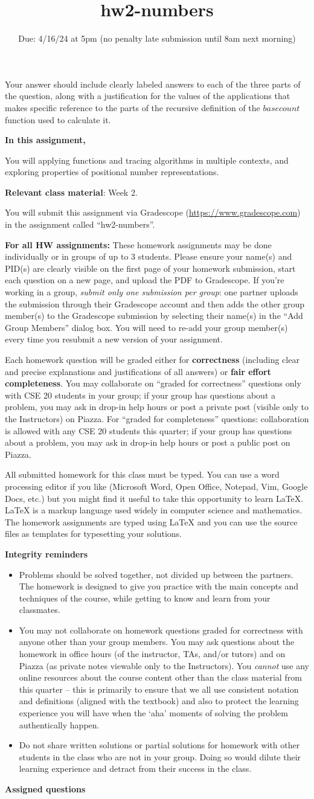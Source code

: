 \documentclass[12pt, oneside]{article}
\newcommand{\instructions}{{\bf For all HW assignments:} 
These homework assignments may be done individually or in groups of up to 3 students.
Please ensure your name(s) and PID(s)
are clearly visible on the first page of your homework
submission, start each question on a new page, and upload the PDF to Gradescope.
If you're working in a group, {\it submit only one submission per group}: one partner uploads the
submission through their Gradescope account and then adds the other group member(s) to the Gradescope submission
by selecting their name(s) in the ``Add Group Members'' dialog box. You will need to re-add your group member(s)
every time you resubmit a new version of your assignment.

Each homework question will be graded either for
{\bf correctness} (including clear and precise explanations and justifications of all answers) or
{\bf fair effort completeness}. You may collaborate on ``graded for correctness''
questions only with CSE 20 students in your group; if your
 group has questions about a problem, you may ask in drop-in help hours or post a private
post (visible only to the Instructors) on Piazza.  
 For ``graded for completeness''
 questions: collaboration is allowed with any CSE 20 students this quarter; 
 if your group has questions about a problem, you may ask in drop-in 
 help hours or post a public post on Piazza.

All submitted homework for this class must be typed. 
You can use a word processing editor if you like (Microsoft Word, Open Office, Notepad, Vim, Google Docs, etc.) 
but you might find it useful to take this opportunity to learn LaTeX. 
LaTeX is a markup language used widely in computer science and mathematics. 
The homework assignments are typed using LaTeX and you can use the source files 
as templates for typesetting your solutions.

{\bf Integrity reminders}
\begin{itemize}
\item Problems should be solved together, not divided up between the partners. The homework is
designed to give you practice with the main concepts and techniques of the course, 
while getting to know and learn from your classmates.
\item You may not collaborate on homework questions graded for correctness with anyone other than your group members.
You may ask questions about the homework in office hours (of the instructor, TAs, and/or tutors) and 
on Piazza (as private notes viewable only to the Instructors).  
You \emph{cannot} use any online resources about the course content other than the class material 
from this quarter -- this is primarily to ensure that we all use consistent notation and
definitions (aligned with the textbook) and also to protect the learning experience you will have when
the `aha' moments of solving the problem authentically happen.
\item Do not share written solutions or partial solutions for homework with 
other students in the class who are not in your group. Doing so would dilute their learning 
experience and detract from their success in the class.
\end{itemize}

}
\begin{document}
\begin{enumerate}[labelindent=0pt, leftmargin=0pt]
\begin{enumerate}
Your answer should include clearly labeled answers to each of the three parts of the question, 
along with a justification for the values of the applications that makes specific reference to 
the parts of the recursive definition of the $basecount$ function used to calculate it.
\end{enumerate}
\end{enumerate}
\newpage

\title{hw2-numbers}
\date{Due: 4/16/24 at 5pm (no penalty late submission until 8am next morning)}

\maketitle
\thispagestyle{fancy}


{\bf In this assignment,}

You will applying functions and tracing algorithms in multiple contexts, 
and exploring properties of positional number representations.

{\bf Relevant class material}: Week 2.

You will submit this assignment via Gradescope
(\href{https://www.gradescope.com}{https://www.gradescope.com}) 
in the assignment called ``hw2-numbers''.

\instructions

{\bf Assigned questions}
\end{document}
